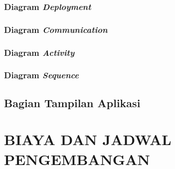 \documentclass[pdftex,12pt, oneside]{article}
\begin{document}
\subsubsection{Diagram \textit{Deployment}}

\subsubsection{Diagram \textit{Communication}}


\subsubsection{Diagram \textit{Activity}}

\subsubsection{Diagram \textit{Sequence}}

\subsection{Bagian Tampilan Aplikasi}

\section{BIAYA DAN JADWAL PENGEMBANGAN}
\end{document}
